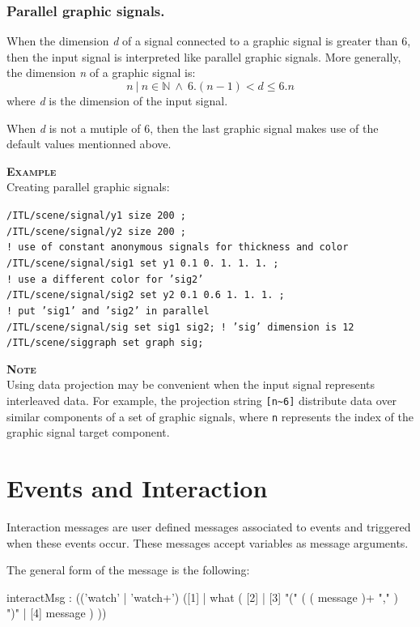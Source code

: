 \documentclass[a4paper,twoside]{report}
\newcommand{\toplevel}[1]	{\chapter{#1}}
\newcommand{\subsublevel}[1]	{\subsection{#1}}
\newcommand{\OSC}[1]		{\texttt{#1}}
\newcommand{\example}		{\textbf{\hspace{-1.5cm}\textbf{\textsc{Example }}}}
\newcommand{\note}	[1]		{\vspace{2mm}\textbf{\hspace{-1.03cm}\textbf{\textsc{Note #1}}}}
\newcommand{\sample}	[1]			{\vspace{-2mm}\begin{center}\colorbox{mygrey}{
								\begin{minipage}[t]{0.9\columnwidth} 
								{\small \texttt{#1}}
								\end{minipage}}\end{center}}
\begin{document}
\subsublevel{Parallel graphic signals.}
\label{pgsignal}
When the dimension \textit{d} of a signal connected to a graphic signal is greater than 6, then the input signal is interpreted like parallel graphic signals. More generally, the dimension \textit{n} of a graphic signal is:
\[
n  \  |\ n \in \mathbb{N}\ \land\ 6.(n-1) < d \leqslant 6.n
\]
where \textit{d} is the dimension of the input signal.

When \textit{d} is not a mutiple of 6, then the last graphic signal makes use of the default values mentionned above.

 
\example \\
Creating parallel graphic signals:
\sample{/ITL/scene/signal/y1 size 200 ; \\
/ITL/scene/signal/y2 size 200 ; \\
! use of constant anonymous signals for thickness and color\\
/ITL/scene/signal/sig1 set y1 0.1 0. 1. 1. 1. ; \\
! use a different color for 'sig2'\\
/ITL/scene/signal/sig2 set y2 0.1 0.6 1. 1. 1. ; \\
! put 'sig1' and 'sig2' in parallel\\
/ITL/scene/signal/sig set sig1 sig2;    \hspace{1CM}! 'sig' dimension is 12\\
/ITL/scene/siggraph set graph sig; 
}

\note{} \\
Using data projection may be convenient when the input signal represents interleaved data. For example, the projection string \OSC{[n\~{}6]} distribute data over similar components of a set of graphic signals, where \OSC{n} represents the index of the graphic signal target component.


\toplevel{Events and Interaction}
\label{interaction}

Interaction messages are user defined messages associated to events and triggered when these events occur. These messages accept variables as message arguments.

The general form of the message is the following:
\begin{rail}
interactMsg : (('watch' | 'watch+')  ([1] | 
					what  ( [2] 
							| [3] "(" ( ( message  )+ "," ) ")" 
							| [4] message )  )) 
\end{rail}
\end{document}

